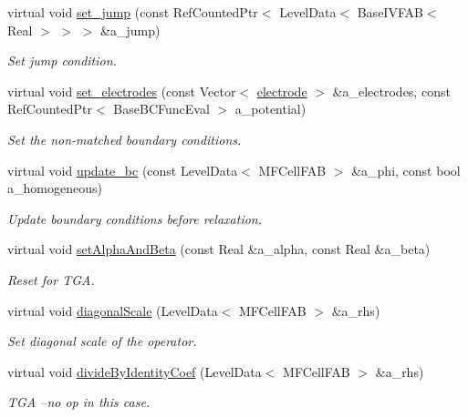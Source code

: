 \begin{DoxyCompactItemize}
virtual void \hyperlink{classnwomfconductivityop_aa34cdce0d0bb999f4ec6fe1d3b3690dc}{set\+\_\+jump} (const Ref\+Counted\+Ptr$<$ Level\+Data$<$ Base\+I\+V\+F\+AB$<$ Real $>$ $>$ $>$ \&a\+\_\+jump)
\begin{DoxyCompactList}\small\item\em Set jump condition. \end{DoxyCompactList}\item 
virtual void \hyperlink{classnwomfconductivityop_a74d2d5f6afd37b00f944b31cab019515}{set\+\_\+electrodes} (const Vector$<$ \hyperlink{classelectrode}{electrode} $>$ \&a\+\_\+electrodes, const Ref\+Counted\+Ptr$<$ Base\+B\+C\+Func\+Eval $>$ a\+\_\+potential)
\begin{DoxyCompactList}\small\item\em Set the non-\/matched boundary conditions. \end{DoxyCompactList}\item 
virtual void \hyperlink{classnwomfconductivityop_a7e633740393f4fbcac8e68619046cbd2}{update\+\_\+bc} (const Level\+Data$<$ M\+F\+Cell\+F\+AB $>$ \&a\+\_\+phi, const bool a\+\_\+homogeneous)
\begin{DoxyCompactList}\small\item\em Update boundary conditions before relaxation. \end{DoxyCompactList}\item 
virtual void \hyperlink{classnwomfconductivityop_a3cdc08636b20034c77febba1799f9907}{set\+Alpha\+And\+Beta} (const Real \&a\+\_\+alpha, const Real \&a\+\_\+beta)
\begin{DoxyCompactList}\small\item\em Reset for T\+GA. \end{DoxyCompactList}\item 
virtual void \hyperlink{classnwomfconductivityop_a76c65e3b381604c624d9478611f9fc4e}{diagonal\+Scale} (Level\+Data$<$ M\+F\+Cell\+F\+AB $>$ \&a\+\_\+rhs)
\begin{DoxyCompactList}\small\item\em Set diagonal scale of the operator. \end{DoxyCompactList}\item 
virtual void \hyperlink{classnwomfconductivityop_a531dee8c364721b218b9f04ada813f66}{divide\+By\+Identity\+Coef} (Level\+Data$<$ M\+F\+Cell\+F\+AB $>$ \&a\+\_\+rhs)
\begin{DoxyCompactList}\small\item\em T\+GA --no op in this case. \end{DoxyCompactList}\item 

\end{DoxyCompactItemize}
